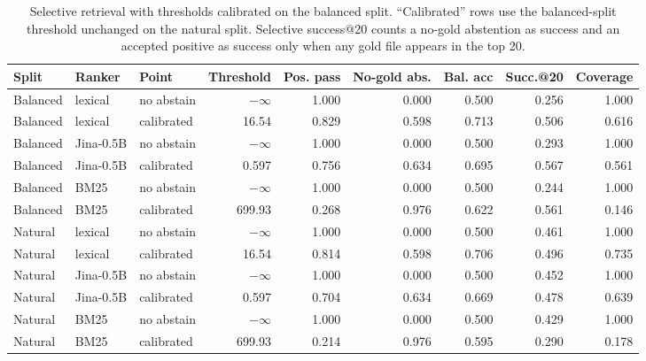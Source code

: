 \documentclass[11pt]{article}
\begin{document}
\begin{table}[t]
\centering
\caption{Selective retrieval with thresholds calibrated on the balanced split. ``Calibrated'' rows use the balanced-split threshold unchanged on the natural split. Selective success@20 counts a no-gold abstention as success and an accepted positive as success only when any gold file appears in the top 20.}
\label{tab:selective-abstention}
\scriptsize
\begin{tabular}{lllrrrrrr}
\toprule
Split & Ranker & Point & Threshold & Pos. pass & No-gold abs. & Bal. acc & Succ.@20 & Coverage \\
\midrule
Balanced & lexical & no abstain & \(-\infty\) & 1.000 & 0.000 & 0.500 & 0.256 & 1.000 \\
Balanced & lexical & calibrated & 16.54 & 0.829 & 0.598 & 0.713 & 0.506 & 0.616 \\
Balanced & Jina-0.5B & no abstain & \(-\infty\) & 1.000 & 0.000 & 0.500 & 0.293 & 1.000 \\
Balanced & Jina-0.5B & calibrated & 0.597 & 0.756 & 0.634 & 0.695 & 0.567 & 0.561 \\
Balanced & BM25 & no abstain & \(-\infty\) & 1.000 & 0.000 & 0.500 & 0.244 & 1.000 \\
Balanced & BM25 & calibrated & 699.93 & 0.268 & 0.976 & 0.622 & 0.561 & 0.146 \\
\midrule
Natural & lexical & no abstain & \(-\infty\) & 1.000 & 0.000 & 0.500 & 0.461 & 1.000 \\
Natural & lexical & calibrated & 16.54 & 0.814 & 0.598 & 0.706 & 0.496 & 0.735 \\
Natural & Jina-0.5B & no abstain & \(-\infty\) & 1.000 & 0.000 & 0.500 & 0.452 & 1.000 \\
Natural & Jina-0.5B & calibrated & 0.597 & 0.704 & 0.634 & 0.669 & 0.478 & 0.639 \\
Natural & BM25 & no abstain & \(-\infty\) & 1.000 & 0.000 & 0.500 & 0.429 & 1.000 \\
Natural & BM25 & calibrated & 699.93 & 0.214 & 0.976 & 0.595 & 0.290 & 0.178 \\
\bottomrule
\end{tabular}
\end{table}
\end{document}
